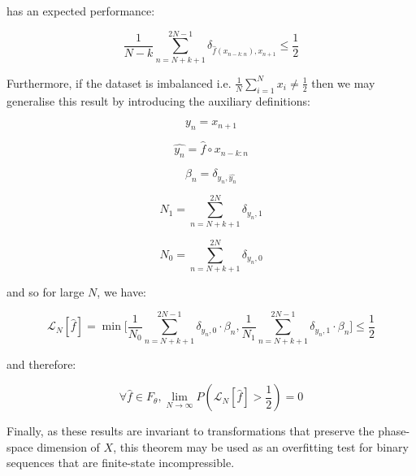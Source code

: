 \documentclass{article}
\begin{document}
has an expected performance: 

\begin{equation}
\frac{1}{N-k} \sum_{n=N+k+1}^{2N-1} \delta_{\hat{f}(x_{n-k:n}),x_{n+1}}
 \leq \frac{1}{2}
\end{equation}

Furthermore, if the dataset is imbalanced i.e. $\frac{1}{N} \sum_{i=1}^N x_i \neq \frac{1}{2}$ then we may generalise this result by introducing the auxiliary definitions: 

\begin{equation}
y_n = x_{n+1}	
\end{equation}

\begin{equation}
\hat{y_n} = \hat{f} \circ x_{n-k:n}
\end{equation}

\begin{equation}
\beta_n = \delta_{y_n,\hat{y_n}}	
\end{equation}

\begin{equation}
N_1 = \sum_{n=N+k+1}^{2N} \delta_{y_n,1}	
\end{equation}

\begin{equation}
N_0 = \sum_{n=N+k+1}^{2N} \delta_{y_n,0}	
\end{equation}

and so for large $N$, we have: 

\begin{equation}
\mathcal{L}_N[\hat{f}] = \min \Big[\frac{1}{N_0} \sum_{n=N+k+1}^{2N-1} \delta_{y_n,0} \cdot \beta_n,  \frac{1}{N_1} \sum_{n=N+k+1}^{2N-1} \delta_{y_n,1} \cdot \beta_n \Big] \leq \frac{1}{2}
\end{equation}

and therefore:


\begin{equation}
\forall \hat{f} \in F_{\theta}, \lim_{N \to \infty} P(\mathcal{L}_N[\hat{f}] > \frac{1}{2}) = 0
\end{equation}

Finally, as these results are invariant to transformations that preserve the 
phase-space dimension of $X$, this theorem may be used as an overfitting test 
for binary sequences that are finite-state incompressible. 
\end{document}

